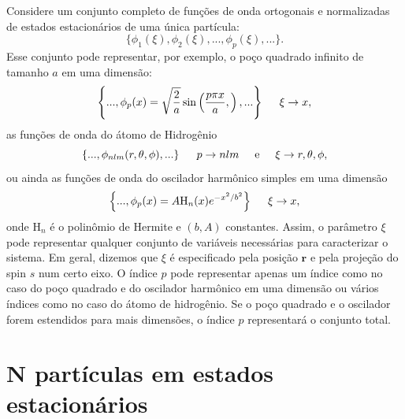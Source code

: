 \documentclass{article}
\begin{document}
Considere um conjunto completo de funções de onda ortogonais e normalizadas de estados estacionários de uma única partícula:
\begin{equation}
    \{ \phi_1(\xi), \phi_2(\xi),...,\phi_p(\xi),... \}.
\end{equation}
Esse conjunto pode representar, por exemplo, o poço quadrado infinito de tamanho $a$ em uma dimensão:
\begin{equation}
    \left\{ ...,\phi_p(x) = \sqrt{\frac{2}{a}}\sin \left(  \frac{p\pi x}{a}  ,  \right),...  \right\} \hspace{0.5cm} \xi \rightarrow x,
\end{equation}
as funções de onda do átomo de Hidrogênio
\begin{equation}
    \left\{..., \phi_{nlm}(r,\theta,\phi),... \right\} \hspace{0.5cm} p\rightarrow nlm \hspace{0.5cm} \text{e} \hspace{0.5cm} \xi \rightarrow r,\theta,\phi ,
\end{equation}
ou ainda as funções de onda do oscilador harmônico simples em uma dimensão
\begin{equation}
    \left\{..., \phi_{p}(x) = A\text{H}_n(x)e^{-x^2 / b^2}   \right\} \hspace{0.5cm} \xi \rightarrow x,
\end{equation}
onde H$_n$ é o polinômio de Hermite e $(b,A)$ constantes. Assim, o parâmetro $\xi$ pode representar qualquer conjunto de variáveis necessárias para caracterizar o sistema. Em geral, dizemos que $\xi$ é especificado pela posição $\mathbf{r}$ e pela projeção do spin $s$ num certo eixo. O índice $p$ pode representar apenas um índice como no caso do poço quadrado e do oscilador harmônico em uma dimensão ou vários índices como no caso do átomo de hidrogênio. Se o poço quadrado e o oscilador forem estendidos para mais dimensões, o índice $p$ representará o conjunto total.

\section{N partículas em estados estacionários}
\end{document}
